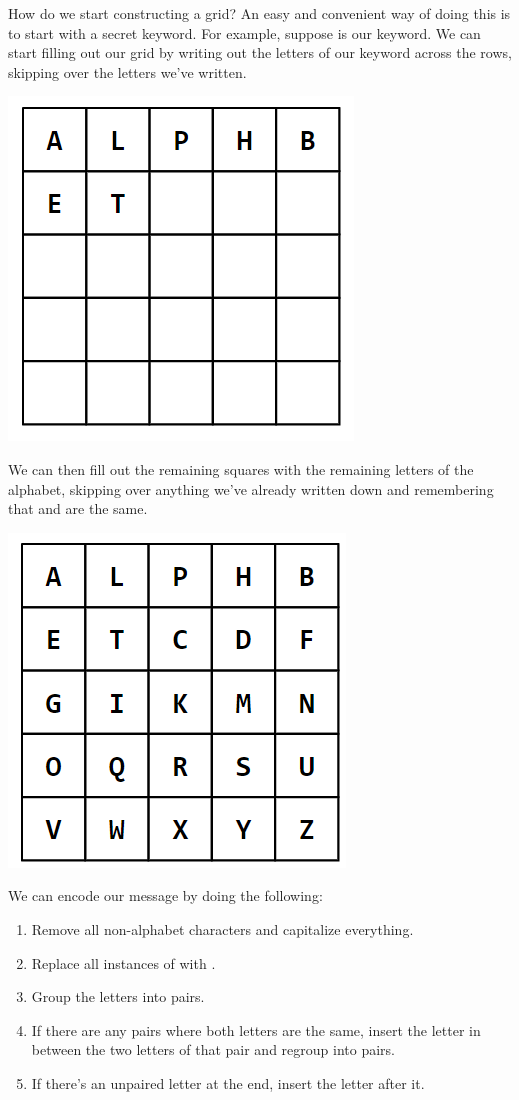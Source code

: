 \documentclass[letterpaper]{article}
\begin{document}
How do we start constructing a grid? An easy and convenient way of doing this is to start with a secret keyword. For example, suppose  is our keyword. We can start filling out our grid by writing out the letters of our keyword across the rows, skipping over the letters we've written.
\begin{center}
    \includegraphics[scale=0.5]{assets/playfair_1.png}
\end{center}
We can then fill out the remaining squares with the remaining letters of the alphabet, skipping over anything we've already written down and remembering that  and  are the same. 
\begin{center}
    \includegraphics[scale=0.5]{assets/playfair_2.png}
\end{center}
We can encode our message by doing the following: 
\begin{enumerate}
    \item Remove all non-alphabet characters and capitalize everything.
    \item Replace all instances of  with . 
    \item Group the letters into pairs. 
    \item If there are any pairs where both letters are the same, insert the letter  in between the two letters of that pair and regroup into pairs. 
    \item If there's an unpaired letter at the end, insert the letter  after it.
\end{enumerate}
\end{document}
